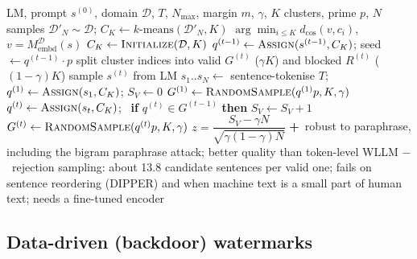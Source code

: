 \documentclass[10pt,a4paper,twocolumn]{article}
\newcommand{\pro}[1]{\Statex\textcolor{proc}{\textbf{+}\ #1}}
\newcommand{\con}[1]{\Statex\textcolor{conc}{\textbf{$-$}\ #1}}
\begin{document}
\begin{algorithm}[H]\small
\caption{$k$-SemStamp generation and detection (Hou et al.\ 2024)}
\begin{algorithmic}[1]
\Require LM, prompt $s^{(0)}$, domain $\mathcal D$, $T$, $N_{\max}$, margin $m$, $\gamma$, $K$ clusters, prime $p$, $N$ samples
 \State $\mathcal D'_N\sim\mathcal D$; \Return $C_K\gets k\text{-means}(\mathcal D'_N,K)$
\EndFunction
{} \State \Return $\arg\min_{i\le K}d_{\cos}(v,c_i)$, $v=M^{\mathcal D}_{\mathrm{embd}}(s)$ \EndFunction
{}
 \State $C_K\gets\textsc{Initialize}(\mathcal D,K)$
  \State $q^{(t-1)}\gets\textsc{Assign}(s^{(t-1)},C_K)$; seed $\gets q^{(t-1)}\cdot p$
  \State split cluster indices into valid $G^{(t)}$ ($\gamma K$) and blocked $R^{(t)}$ ($(1-\gamma)K$)
  \Repeat
   \State sample $s^{(t)}$ from LM
 \EndFor
\EndProcedure
{}
 \State $s_1..s_N\gets$ sentence-tokenise $T$; $q^{(1)}\gets\textsc{Assign}(s_1,C_K)$; $S_V\gets0$
 \State $G^{(1)}\gets\textsc{RandomSample}(q^{(1)}p,K,\gamma)$
  \State $q^{(t)}\gets\textsc{Assign}(s_t,C_K)$; \ \textbf{if} $q^{(t)}\in G^{(t-1)}$ \textbf{then} $S_V\gets S_V+1$
  \State $G^{(t)}\gets\textsc{RandomSample}(q^{(t)}p,K,\gamma)$
 \EndFor
 \State \Return $z=\dfrac{S_V-\gamma N}{\sqrt{\gamma(1-\gamma)N}}$
\EndProcedure
\pro{robust to paraphrase, including the bigram paraphrase attack; better quality than token-level WLLM}
\con{rejection sampling: about 13.8 candidate sentences per valid one; fails on sentence reordering (DIPPER) and when machine text is a small part of human text; needs a fine-tuned encoder}
\end{algorithmic}
\end{algorithm}

\subsection*{Data-driven (backdoor) watermarks}
\end{document}
